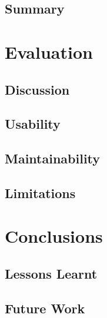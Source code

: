 \documentclass[authoryearcitations]{UoYCSproject}
\begin{document}
\section{Summary}

\chapter{Evaluation}

\section{Discussion}

\section{Usability}

\section{Maintainability}

\section{Limitations}

\chapter{Conclusions}

\section{Lessons Learnt}

\section{Future Work}



\end{document}
